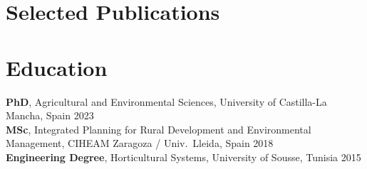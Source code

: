 \documentclass[10pt, a4paper]{article}
\begin{document}
\section{Selected Publications}

\nocite{chakhar2020accuracy, chakhar2021cropclassification, chakhar2024irrigation}
\printbibliography[heading=none]

\section{Education}

\textbf{PhD}, Agricultural and Environmental Sciences, University of Castilla-La Mancha, Spain \hfill 2023\\
\textbf{MSc}, Integrated Planning for Rural Development and Environmental Management, CIHEAM Zaragoza / Univ.\ Lleida, Spain \hfill 2018\\
\textbf{Engineering Degree}, Horticultural Systems, University of Sousse, Tunisia \hfill 2015
\end{document}
